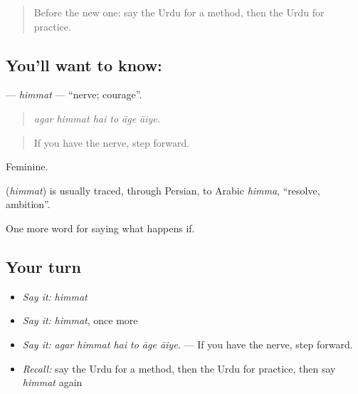 \label{lesson:UR-C380-himmat}



\begin{quote}
Before the new one: say the Urdu for a method, then the Urdu for practice.
\end{quote}

\subsection*{You'll want to know: }
\textbf{} — \emph{himmat} — \textquotedblleft{}nerve; courage\textquotedblright{}.

\begin{quote}
     
\end{quote}

\begin{quote}
\emph{agar himmat hai to āge āiye.}
\end{quote}

\begin{quote}
If you have the nerve, step forward.
\end{quote}

Feminine.

\begin{cousinweb}
\textbf{} (\emph{himmat}) is usually traced, through Persian, to Arabic \emph{himma}, \textquotedblleft{}resolve, ambition\textquotedblright{}.
\end{cousinweb}

\begin{grammarlens}[title={What you've built}]
One more word for saying what happens if.
\end{grammarlens}

\subsection*{Your turn}
\begin{itemize}
\raggedright
  \item \emph{Say it:} \emph{himmat}
  \item \emph{Say it:} \emph{himmat}, once more
  \item \emph{Say it:} \emph{agar himmat hai to āge āiye.} — If you have the nerve, step forward.
  \item \emph{Recall:} say the Urdu for a method, then the Urdu for practice, then say \emph{himmat} again
\end{itemize}


